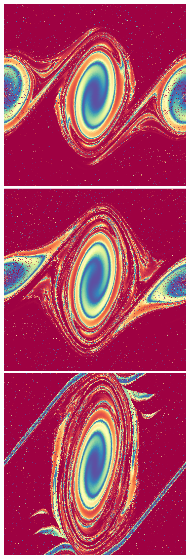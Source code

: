 \documentclass[notitlepage,letterpaper,12pt]{article} %
\begin{document}
\begin{figure}[h]
  \centering
   \includegraphics[scale= 0.6]{snap60.png}
   \includegraphics[scale= 0.6]{snap70.png}
   \includegraphics[scale= 0.6]{snap80.png}

\end{figure}
\end{document}
